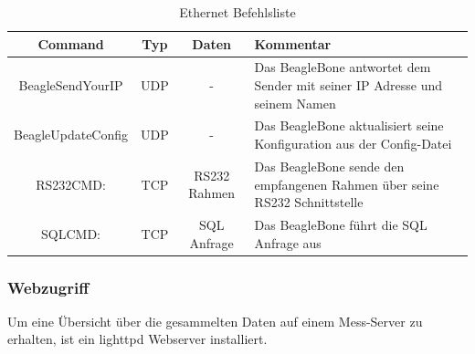 \begin{table}[H]
\begin{center}
\begin{tabularx}{\textwidth}{|c|c|c|X|}\hline 
 Command & Typ & Daten & Kommentar \\ \hline
 BeagleSendYourIP & UDP & - & Das BeagleBone antwortet dem Sender mit seiner IP Adresse und seinem Namen  \\ \hline
 BeagleUpdateConfig & UDP & - & Das BeagleBone aktualisiert seine Konfiguration aus der Config-Datei \\ \hline
 RS232CMD: & TCP & RS232 Rahmen & Das BeagleBone sende den empfangenen Rahmen über seine RS232 Schnittstelle \\ \hline
 SQLCMD: & TCP & SQL Anfrage & Das BeagleBone führt die SQL Anfrage aus \\ \hline
\end{tabularx}
\caption{Ethernet Befehlsliste}
\label{table_EthernetCommands}
\end{center}
\end{table}

\subsubsection{Webzugriff}

Um eine Übersicht über die gesammelten Daten auf einem Mess-Server zu erhalten, ist ein lighttpd Webserver installiert.
